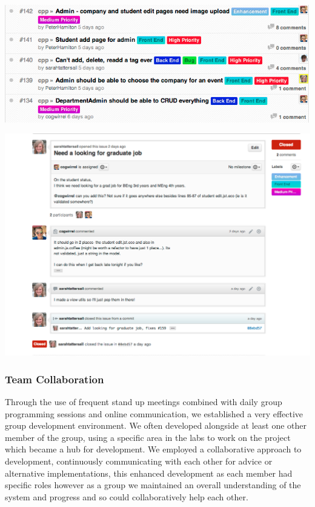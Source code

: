     \includegraphics[scale=0.3]{images/project_management/team_management/github_issues}

    \includegraphics[scale=0.3]{images/project_management/team_management/graduate_issue}


  \subsubsection{Team Collaboration}
    Through the use of frequent stand up meetings combined with daily group programming sessions and online communication, we established a very effective group development environment. We often developed alongside at least one other member of the group, using a specific area in the labs to work on the project which became a hub for development. We employed a collaborative approach to development, continuously communicating with each other for advice or alternative implementations, this enhanced development as each member had specific roles however as a group we maintained an overall understanding of the system and progress and so could collaboratively help each other.

